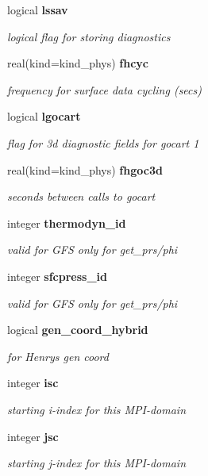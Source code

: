 \begin{DoxyCompactItemize}
logical \textbf{ lssav}
\begin{DoxyCompactList}\small\item\em logical flag for storing diagnostics \end{DoxyCompactList}\item 
real(kind=kind\+\_\+phys) \textbf{ fhcyc}
\begin{DoxyCompactList}\small\item\em frequency for surface data cycling (secs) \end{DoxyCompactList}\item 
logical \textbf{ lgocart}
\begin{DoxyCompactList}\small\item\em flag for 3d diagnostic fields for gocart 1 \end{DoxyCompactList}\item 
real(kind=kind\+\_\+phys) \textbf{ fhgoc3d}
\begin{DoxyCompactList}\small\item\em seconds between calls to gocart \end{DoxyCompactList}\item 
integer \textbf{ thermodyn\+\_\+id}
\begin{DoxyCompactList}\small\item\em valid for G\+FS only for get\+\_\+prs/phi \end{DoxyCompactList}\item 
integer \textbf{ sfcpress\+\_\+id}
\begin{DoxyCompactList}\small\item\em valid for G\+FS only for get\+\_\+prs/phi \end{DoxyCompactList}\item 
logical \textbf{ gen\+\_\+coord\+\_\+hybrid}
\begin{DoxyCompactList}\small\item\em for Henry\textquotesingle{}s gen coord \end{DoxyCompactList}\item 
integer \textbf{ isc}
\begin{DoxyCompactList}\small\item\em starting i-\/index for this M\+P\+I-\/domain \end{DoxyCompactList}\item 
integer \textbf{ jsc}
\begin{DoxyCompactList}\small\item\em starting j-\/index for this M\+P\+I-\/domain \end{DoxyCompactList}\item 

\end{DoxyCompactItemize}
